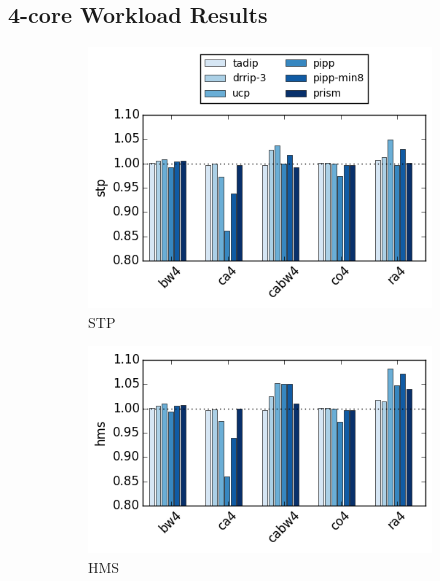 \subsection{4-core Workload Results}

\begin{figure}[t]
    \centering
    \begin{subfigure}[b]{0.3\textwidth}
        \includegraphics[width=\textwidth]{figures/results/avg-stp-0128k-0100-4-avg}
        \caption{STP}
        \label{fig:results:base:4-avg:stp}
    \end{subfigure}%
    \begin{subfigure}[b]{0.3\textwidth}
        \includegraphics[width=\textwidth]{figures/results/avg-hms-0128k-0100-4-avg}
        \caption{HMS}
        \label{fig:results:base:4-avg:hms}
    \end{subfigure}
    \begin{subfigure}[b]{0.3\textwidth}

\end{subfigure}
\end{figure}
